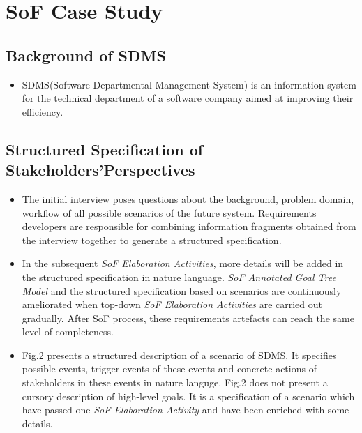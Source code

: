 ﻿\documentclass{beamer}
\begin{document}
\section{SoF Case Study}
\subsection{Background of SDMS}
\begin{frame}    %
  \begin{itemize}
  \item 
    SDMS(Software Departmental Management System) is an information system for the technical department of a software company aimed at improving their efficiency.
  \end{itemize}    
\end{frame}  

\subsection{Structured Specification of Stakeholders’Perspectives}
\begin{frame}     %
  \footnotesize{
    \begin{itemize}
    \item The initial interview poses questions about the background, problem domain, workflow of all possible scenarios of the future system. Requirements developers are responsible for combining information fragments obtained from the interview together to generate a structured specification.\pause
    \item  In the subsequent \emph{SoF Elaboration Activities}, more details will be added in the structured specification in nature language. \emph{SoF Annotated Goal Tree Model} and the structured specification based on scenarios are continuously ameliorated when top-down \emph{SoF Elaboration Activities} are carried out gradually. After SoF process, these requirements artefacts can reach the same level of completeness.\pause
    \item Fig.2 presents a structured description of a scenario of SDMS. It specifies possible events, trigger events of these events and concrete actions of stakeholders in these events in nature languge. Fig.2 does not present a cursory description of high-level goals. It is a specification of a scenario which have passed one \emph{SoF Elaboration Activity} and have been enriched with some details.\pause
    \end{itemize}
  }
\end{frame}
\end{document}
